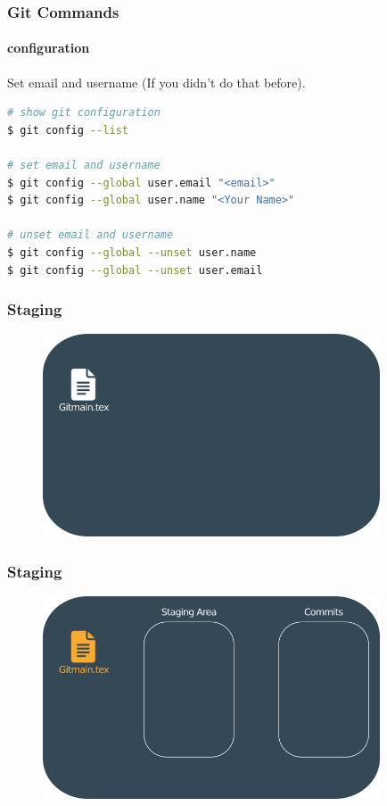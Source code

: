 \documentclass{beamer}
\begin{document}
	\begin{frame}[fragile]
		\frametitle{Git Commands}
		\framesubtitle{configuration}
		
		Set email and username (If you didn't do that before).		
		
\begin{lstlisting}[language=bash]
# show git configuration
$ git config --list

# set email and username
$ git config --global user.email "<email>"
$ git config --global user.name "<Your Name>"

# unset email and username
$ git config --global --unset user.name
$ git config --global --unset user.email
\end{lstlisting}
	
	\end{frame}
	
	\begin{frame}
		\frametitle{Staging}
		\begin{figure}[htbp]
			\centering
			\includegraphics[width=10cm]{staging1}
		\end{figure}
	\end{frame}
	
	\begin{frame}
		\frametitle{Staging}
		\begin{figure}[htbp]
			\centering
			\includegraphics[width=10cm]{staging2}
		\end{figure}
	\end{frame}
	
\end{document}
